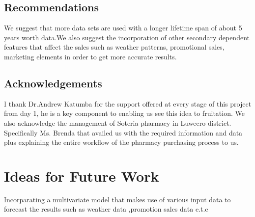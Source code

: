 \documentclass[12pt]{report}
\begin{document}
\subsection{Recommendations}
We suggest that more data sets are used with a longer lifetime span of about 5 years worth data.We also suggest the incorporation of other secondary dependent features that affect the sales such as weather patterns, promotional sales, marketing elements in order to get more accurate results. 

\subsection{Acknowledgements}
I thank Dr.Andrew Katumba for the support offered at every stage of this project from day 1, he is a key component to enabling us see this idea to fruitation. We also acknowledge the management of Soteria pharmacy in Luweero district. Specifically Ms. Brenda that availed us with the required information and data plus explaining the entire workflow of the pharmacy purchasing process to us.\\

\section{Ideas for Future Work}
Incorparating a multivariate model that makes use of various input data to forecast the results such as weather data ,promotion sales data e.t.c














%

\medskip
%
%
%
\end{document}

